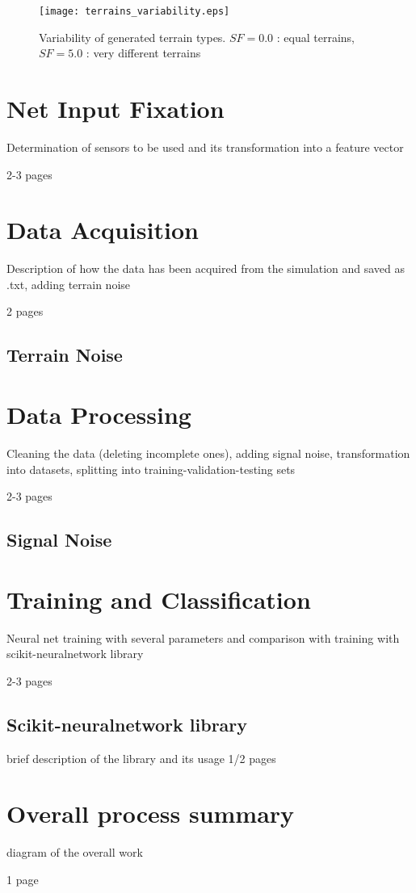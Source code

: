 \begin{figure}[H]
  \centering
  \texttt{[image: terrains\_variability.eps]}
  \caption{Variability of generated terrain types. $ SF=0.0 $ : equal terrains, $ SF=5.0 $ : very different terrains}
  \label{fig:terrains_parameters}
\end{figure}


\section{Net Input Fixation}
Determination of sensors to be used and its transformation into a feature vector

2-3 pages

\section{Data Acquisition}
Description of how the data has been acquired from the simulation and saved as .txt, adding terrain noise

2 pages
\subsection{Terrain Noise}

\section{Data Processing}
Cleaning the data (deleting incomplete ones), adding signal noise, transformation into datasets, splitting into training-validation-testing sets

2-3 pages
\subsection{Signal Noise}

\section{Training and Classification}

Neural net training with several parameters and comparison with training with scikit-neuralnetwork library

2-3 pages

\subsection{Scikit-neuralnetwork library}
brief description of the library and its usage 1/2 pages

\section{Overall process summary}
diagram of the overall work

1 page